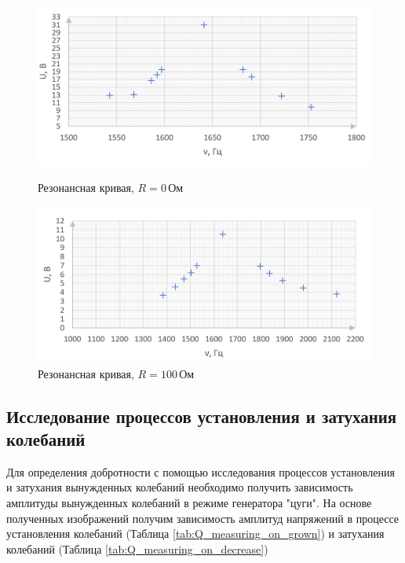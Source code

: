 \documentclass[10pt,a4paper]{article}
\begin{document}
	\begin{figure}[h!]
		\begin{minipage}{0.49\textwidth}
			\hspace{-0.5cm}
			\includegraphics[width = 1.1\textwidth]{GraphR0.png}
			\caption{Резонансная кривая, $R = 0\,$Ом}
			\label{fig:graph_of_depence_amplitude_R=0}
		\end{minipage}
		\hfill
		\begin{minipage}{0.49\textwidth}
			\hspace{-0.5cm}
			\includegraphics[width = 1.1\textwidth]{GraphR100.png}
			\caption{Резонансная кривая, $R = 100\,$Ом}
			\label{fig:graph_of_depence_amplitude_R=100}
		\end{minipage}
	\end{figure}
	
	\subsection{Исследование процессов установления и затухания колебаний}
	
	Для определения добротности с помощью исследования процессов установления и затухания вынужденных колебаний необходимо получить зависимость амплитуды вынужденных колебаний в режиме генератора "цуги".
	На основе полученных изображений получим зависимость амплитуд напряжений в процессе установления колебаний (Таблица \ref{tab:Q_measuring_on_grown}) и затухания колебаний (Таблица \ref{tab:Q_measuring_on_decrease})
	
\end{document}
